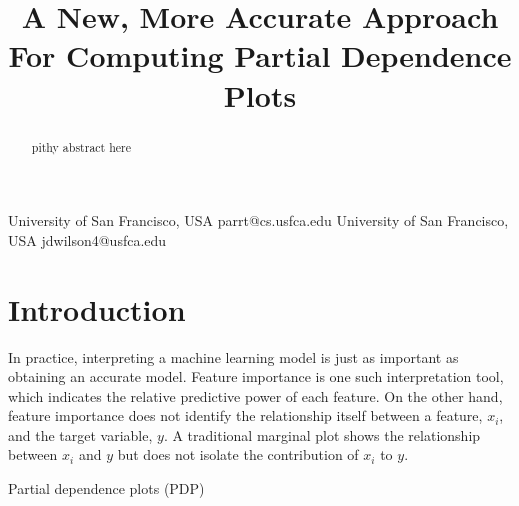 \documentclass[10pt]{sigplanconf}
\begin{document}
\setlength{\pdfpageheight}{\paperheight}
\setlength{\pdfpagewidth}{\paperwidth}

\title{A New, More Accurate Approach For Computing Partial Dependence Plots}

           {University of San Francisco, USA\vspace{-1mm}}
           {parrt@cs.usfca.edu}
           {University of San Francisco, USA\vspace{-1mm}}
           {jdwilson4@usfca.edu}

\maketitle

\begin{abstract}
pithy abstract here
\end{abstract}

\section{Introduction}

In practice, interpreting a machine learning model is just as important as obtaining an accurate model. Feature importance is one such interpretation tool, which indicates the relative predictive power of each feature.  On the other hand, feature importance does not identify the relationship itself between a feature, $x_i$, and the target variable, $y$. A traditional marginal plot shows the relationship between $x_i$ and $y$ but does not isolate the contribution of $x_i$ to $y$.

Partial dependence plots (PDP) \cite{PDP} 

 \cite{ICE}




\vfill\eject




\end{document}

